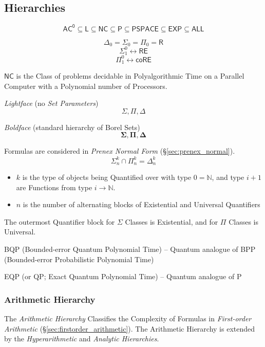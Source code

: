 \subsection{Hierarchies}\label{sec:complexity_hierarchy}

\[
  \mathsf{AC^0} \subseteq \mathsf{L} \subseteq \mathsf{NC} \subseteq
  \mathsf{P} \subseteq \mathsf{PSPACE} \subseteq \mathsf{EXP}
  \subseteq \mathsf{ALL}
\]

\[
  \Delta_0 = \Sigma_0 = \Pi_0 = \mathsf{R}
\]\[
  \Sigma_1^0 \leftrightarrow \mathsf{RE}
\]\[
  \Pi_1^0 \leftrightarrow \mathsf{coRE}
\]

\emph{$\mathsf{NC}$} is the Class of problems decidable in
Polyalgorithmic Time on a Parallel Computer with a Polynomial number
of Processors.

\emph{Lightface} (no \emph{Set Parameters}) %
\[
  \Sigma, \Pi, \Delta
\]

\emph{Boldface} (standard hierarchy of Borel Sets)
\[
  \mathbf{\Sigma}, \mathbf{\Pi}, \mathbf{\Delta}
\]

Formulas are considered in \emph{Prenex Normal Form}
(\S\ref{sec:prenex_normal}).
\[
  \Sigma^k_n \cap \Pi^k_n = \Delta^k_n
\]
\begin{itemize}
  \item $k$ is the type of objects being Quantified over with type
    $0 = \mathbb{N}$, and type $i + 1$ are Functions from type $i
    \rightarrow \mathbb{N}$.
  \item $n$ is the number of alternating blocks of Existential and
    Universal Quantifiers
\end{itemize}
The outermost Quantifier block for $\Sigma$ Classes is Existential,
and for $\Pi$ Classes is Universal.

BQP (Bounded-error Quantum Polynomial Time) -- Quantum analogue of
BPP (Bounded-error Probabilistic Polynomial Time)

EQP (or QP; Exact Quantum Polynomial Time) -- Quantum analogue of P



\subsubsection{Arithmetic Hierarchy}\label{sec:arithmetic_hierarchy}

The \emph{Arithmetic Hierarchy} Classifies the Complexity of Formulas
in \emph{First-order Arithmetic}
(\S\ref{sec:firstorder_arithmetic}). The Arithmetic Hierarchy is
extended by the \emph{Hyperarithmetic} and \emph{Analytic
  Hierarchies}.


